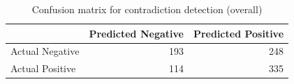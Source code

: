 \begin{table}
\caption{Confusion matrix for contradiction detection (overall)}
\label{tab:confusion_matrix}
\begin{tabular}{lrr}
\toprule
 & Predicted Negative & Predicted Positive \\
\midrule
Actual Negative & 193 & 248 \\
Actual Positive & 114 & 335 \\
\bottomrule
\end{tabular}
\end{table}
